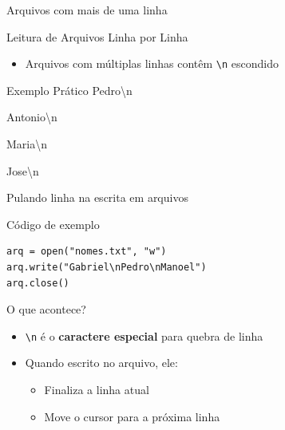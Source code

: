 \begin{frame}[fragile]{Arquivos com mais de uma linha}

    \begin{block}{Leitura de Arquivos Linha por Linha}
        \begin{itemize}
            \item Arquivos com múltiplas linhas contêm \texttt{\textbackslash n} escondido

        \end{itemize}
    \end{block}

    \begin{exampleblock}{Exemplo Prático}
        Pedro\textbackslash n

        Antonio\textbackslash n

        Maria\textbackslash n

        Jose\textbackslash n
    \end{exampleblock}

\end{frame}

\begin{frame}[fragile]{Pulando linha na escrita em arquivos}

    \begin{block}{Código de exemplo}
        \begin{verbatim}
arq = open("nomes.txt", "w")
arq.write("Gabriel\nPedro\nManoel")
arq.close()
\end{verbatim}
    \end{block}



    \begin{alertblock}{O que acontece?}
        \begin{itemize}
            \item \texttt{\textbackslash n} é o \textbf{caractere especial} para quebra de linha
            \item Quando escrito no arquivo, ele:
                  \begin{itemize}
                      \item Finaliza a linha atual
                      \item Move o cursor para a próxima linha
                  \end{itemize}

        \end{itemize}
    \end{alertblock}


\end{frame}

